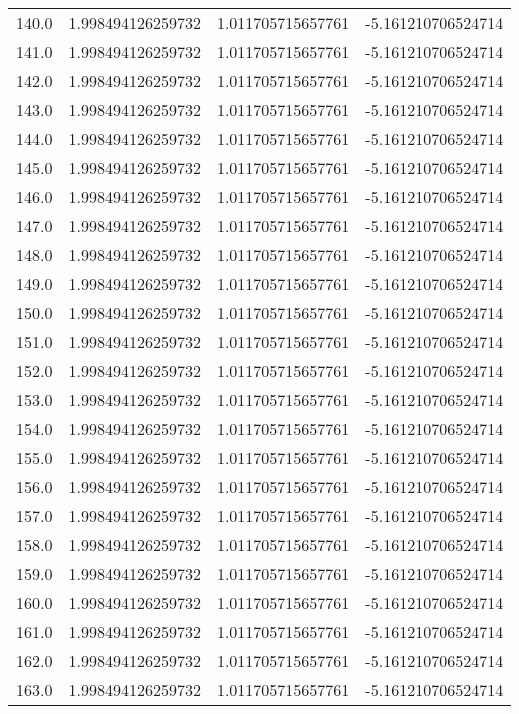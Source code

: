 \begin{longtable}{lrrr}
140.0 & 1.998494126259732 & 1.011705715657761 & -5.161210706524714 \\
141.0 & 1.998494126259732 & 1.011705715657761 & -5.161210706524714 \\
142.0 & 1.998494126259732 & 1.011705715657761 & -5.161210706524714 \\
143.0 & 1.998494126259732 & 1.011705715657761 & -5.161210706524714 \\
144.0 & 1.998494126259732 & 1.011705715657761 & -5.161210706524714 \\
145.0 & 1.998494126259732 & 1.011705715657761 & -5.161210706524714 \\
146.0 & 1.998494126259732 & 1.011705715657761 & -5.161210706524714 \\
147.0 & 1.998494126259732 & 1.011705715657761 & -5.161210706524714 \\
148.0 & 1.998494126259732 & 1.011705715657761 & -5.161210706524714 \\
149.0 & 1.998494126259732 & 1.011705715657761 & -5.161210706524714 \\
150.0 & 1.998494126259732 & 1.011705715657761 & -5.161210706524714 \\
151.0 & 1.998494126259732 & 1.011705715657761 & -5.161210706524714 \\
152.0 & 1.998494126259732 & 1.011705715657761 & -5.161210706524714 \\
153.0 & 1.998494126259732 & 1.011705715657761 & -5.161210706524714 \\
154.0 & 1.998494126259732 & 1.011705715657761 & -5.161210706524714 \\
155.0 & 1.998494126259732 & 1.011705715657761 & -5.161210706524714 \\
156.0 & 1.998494126259732 & 1.011705715657761 & -5.161210706524714 \\
157.0 & 1.998494126259732 & 1.011705715657761 & -5.161210706524714 \\
158.0 & 1.998494126259732 & 1.011705715657761 & -5.161210706524714 \\
159.0 & 1.998494126259732 & 1.011705715657761 & -5.161210706524714 \\
160.0 & 1.998494126259732 & 1.011705715657761 & -5.161210706524714 \\
161.0 & 1.998494126259732 & 1.011705715657761 & -5.161210706524714 \\
162.0 & 1.998494126259732 & 1.011705715657761 & -5.161210706524714 \\
163.0 & 1.998494126259732 & 1.011705715657761 & -5.161210706524714 \\

\end{longtable}
